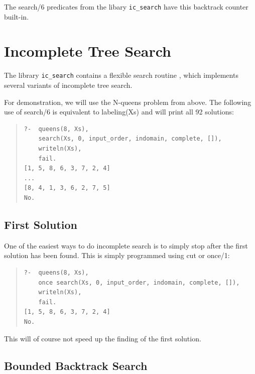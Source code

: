 The search/6 predicates from the libary {\tt ic_search} 
have this backtrack counter built-in.


\section{Incomplete Tree Search}

The library {\tt ic_search} contains a flexible
search routine
,
which implements several variants of incomplete tree search.

For demonstration, we will use the N-queens problem from above.
The following use of search/6 is equivalent to labeling(Xs) and
will print all 92 solutions:
\begin{quote}\begin{verbatim}
?-  queens(8, Xs),
    search(Xs, 0, input_order, indomain, complete, []),
    writeln(Xs),
    fail.
[1, 5, 8, 6, 3, 7, 2, 4]
...
[8, 4, 1, 3, 6, 2, 7, 5]
No.
\end{verbatim}\end{quote}


\subsection{First Solution}

One of the easiest ways to do incomplete search is to simply stop after
the first solution has been found. This is simply programmed using cut or
once/1:
\begin{quote}\begin{verbatim}
?-  queens(8, Xs),
    once search(Xs, 0, input_order, indomain, complete, []),
    writeln(Xs),
    fail.
[1, 5, 8, 6, 3, 7, 2, 4]
No.
\end{verbatim}\end{quote}
This will of course not speed up the finding of the first solution.


\subsection{Bounded Backtrack Search} 

